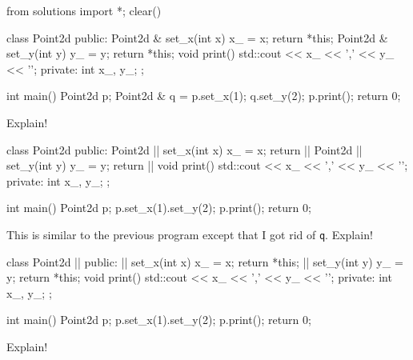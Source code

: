 \begin{python0}
from solutions import *; clear()
\end{python0}

\begin{consolethree}[escapeinside=||]
class Point2d
{
public:
    Point2d & set_x(int x) { x_ = x; return *this; }
    Point2d & set_y(int y) { y_ = y; return *this; }
    void print()
    {
        std::cout << x_ << ',' << y_ << '\n';
    }
private:
    int x_, y_;
};

int main()
{
    Point2d p;
    Point2d & q = p.set_x(1);
    q.set_y(2);
    p.print();
    return 0;
}
\end{consolethree}

Explain!

\begin{consolethree}[escapeinside=||]
class Point2d
{
public:
    Point2d |\EMPHASIZE{\&}| set_x(int x)
    {
        x_ = x;
        return ||
    }
    Point2d |\EMPHASIZE{\&}| set_y(int y)
    {
        y_ = y;
        return ||
    }
    void print()
    {
        std::cout << x_ << ',' << y_ << '\n';
    }
private:
    int x_, y_;
};

int main()
{
    Point2d p;
    p.set_x(1).set_y(2);
    p.print();
    return 0;
}
\end{consolethree}

This is similar to the previous program except that I got rid of \texttt{q}. Explain!

\begin{consolethree}[escapeinside=||]
class Point2d ||
{
public:
    || set_x(int x)
    {
        x_ = x;
        return *this;
    }
    || set_y(int y)
    {
        y_ = y;
        return *this;
    }
    void print()
    {
        std::cout << x_ << ',' << y_ << '\n';
    }
private:
    int x_, y_;
};

int main()
{
    Point2d p;
    p.set_x(1).set_y(2);
    p.print();
    return 0;
}
\end{consolethree}
Explain!


